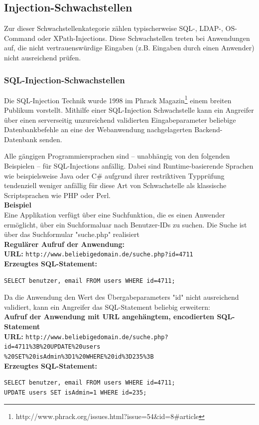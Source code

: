 \subsection{Injection-Schwachstellen}

Zur dieser Schwachstellenkategorie zählen typischerweise SQL-, LDAP-, OS-Command oder XPath-Injections. Diese Schwachstellen treten bei Anwendungen auf, die nicht vertrauenswürdige Eingaben (z.B. Eingaben durch einen Anwender) nicht ausreichend prüfen.


\subsubsection{SQL-Injection-Schwachstellen}

Die SQL-Injection Technik wurde 1998 im Phrack Magazin\footnote{http://www.phrack.org/issues.html?issue=54\&id=8\#article} einem breiten Publikum vorstellt. Mithilfe einer SQL-Injection Schwachstelle kann ein Angreifer über einen serverseitig unzureichend validierten Eingabeparameter beliebige Datenbankbefehle an eine der Webanwendung nachgelagerten Backend-Datenbank senden.

Alle gängigen Programmiersprachen sind – unabhängig von den folgenden Beispielen – für SQL-Injections anfällig. Dabei sind Runtime-basierende Sprachen wie beispielsweise Java oder C\# aufgrund ihrer  restriktiven Typprüfung tendenziell weniger anfällig für diese Art von Schwachstelle als klassische Scriptsprachen wie PHP oder Perl.
\\
\textbf{Beispiel}
\\
Eine Applikation verfügt über eine Suchfunktion, die es einen Anwender ermöglicht, über ein Suchformaluar nach Benutzer-IDs
zu suchen. Die Suche ist über das Suchformular "suche.php" realisiert
\\
\textbf{Regulärer Aufruf der Anwendung:}
\\
\textbf{URL:} \texttt{http://www.beliebigedomain.de/suche.php?id=4711}
\\
\textbf{Erzeugtes SQL-Statement:}
\begin{lstlisting}[basicstyle=\ttfamily\footnotesize]
SELECT benutzer, email FROM users WHERE id=4711;
\end{lstlisting}
Da die Anwendung den Wert des Übergabeparameters "id" nicht ausreichend validiert, kann ein Angreifer das SQL-Statement beliebig erweitern:
\\
\textbf{Aufruf der Anwendung mit URL angehängtem, encodierten SQL-Statement}
\\
\textbf{URL:} \texttt{http://www.beliebigedomain.de/suche.php?id=4711\%3B\%20UPDATE\%20users\\\%20SET\%20isAdmin\%3D1\%20WHERE\%20id\%3D235\%3B}
\\
\textbf{Erzeugtes SQL-Statement:}
\begin{lstlisting}[basicstyle=\ttfamily\footnotesize]
SELECT benutzer, email FROM users WHERE id=4711; 
UPDATE users SET isAdmin=1 WHERE id=235;
\end{lstlisting}

